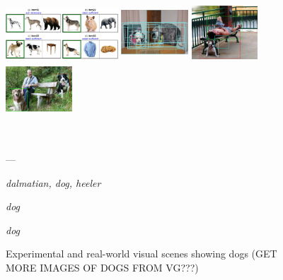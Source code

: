 \documentclass[runningheads]{llncs}
\begin{document}
\begin{figure}[t]
	\begin{center}
		\begin{minipage}{.35\textwidth}
			\includegraphics[width=4.2cm]{fig/graffig.jpg}
		\end{minipage}
		\begin{minipage}{.2\textwidth}
			\includegraphics[height=2cm,width=2.5cm]{fig/visual_genome_dogs.png}
		\end{minipage}
	\begin{minipage}{.2\textwidth}
		\includegraphics[height=2cm,width=2.5cm]{fig/flickr_1003163366_dog_boxes_crop.jpg}
	\end{minipage}
	\begin{minipage}{.2\textwidth}
		\includegraphics[height=2cm,width=2.5cm]{fig/refcoco_2400_dog_boxes_crop.jpg}
	\end{minipage}\vspace{-0cm}\\
\begin{minipage}{.35\textwidth}
	---
\end{minipage}
\begin{minipage}{.2\textwidth}
	\tiny
	{\textsl{dalmatian, dog, heeler}}
\end{minipage}
\begin{minipage}{.2\textwidth}
	\textsl{\tiny dog}
\end{minipage}
\begin{minipage}{.2\textwidth}
	\tiny \textsl{dog}
\end{minipage}
	\end{center}
	\caption{Experimental and real-world visual scenes showing dogs (GET MORE IMAGES OF DOGS FROM VG???)}
	\label{fig:graf_genome}
\end{figure}
\end{document}
